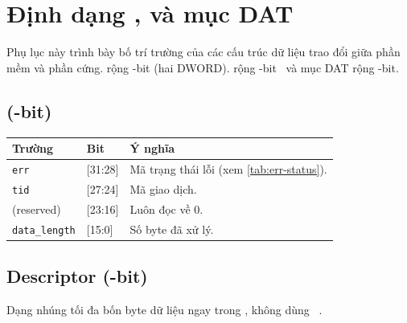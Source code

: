 \chapter{Định dạng \CommandDescriptor{}, \ResponseDescriptor{} và mục DAT}
\label{app:desc}

Phụ lục này trình bày bố trí trường của các cấu trúc dữ liệu trao đổi giữa phần mềm và phần cứng. \CommandDescriptor{} rộng \CommandDescriptorWidth{}-bit (hai DWORD). \ResponseDescriptor{} rộng \ResponseDescriptorWidth{}-bit~\cite{mipi_i3c_tcri} và mục DAT rộng \DatEntryWidth{}-bit.

\section*{\ResponseDescriptor{} (\ResponseDescriptorWidth{}-bit)}

\begin{longtable}{C{3.2cm} C{2.6cm} L{7.0cm}}
	\toprule
	\textbf{Trường}       & \textbf{Bit} & \textbf{Ý nghĩa}                               \\
	\midrule
	\endhead
	\texttt{err}          & [31:28]      & Mã trạng thái lỗi (xem \cref{tab:err-status}). \\
	\texttt{tid}          & [27:24]      & Mã giao dịch.                                  \\
	(reserved)            & [23:16]      & Luôn đọc về 0.                                 \\
	\texttt{data\_length} & [15:0]       & Số byte đã xử lý.                              \\
	\bottomrule
\end{longtable}

\section*{\ImmediateDataTransfer{} Descriptor (\CommandDescriptorWidth{}-bit)}

Dạng \ImmediateDataTransfer{} nhúng tối đa bốn byte dữ liệu ngay trong \CommandDescriptor{}, không dùng
\TxFifo{}~\cite{mipi_i3c_tcri}.

